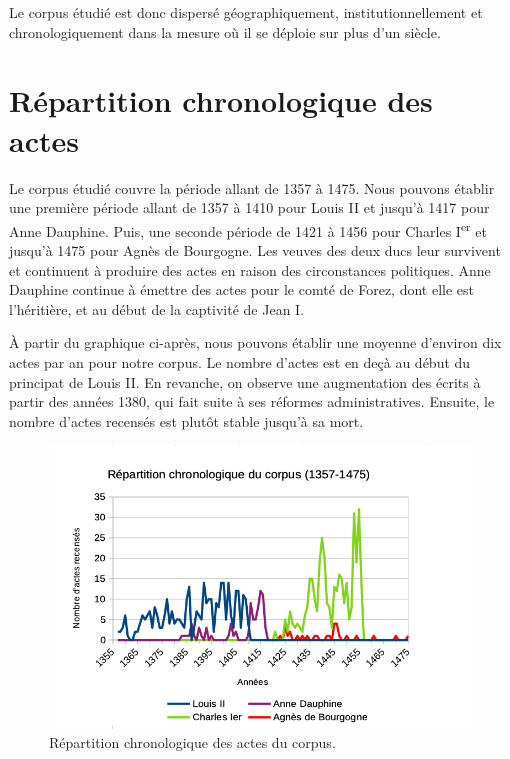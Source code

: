 \par Le corpus étudié est donc dispersé géographiquement, institutionnellement et chronologiquement dans la mesure où il se déploie sur plus d'un siècle. 

\section{Répartition chronologique des actes}
\label{I.1.2}

\par Le corpus étudié couvre la période allant de 1357 à 1475. Nous pouvons établir une première période allant de 1357 à 1410 pour Louis II et jusqu'à 1417 pour Anne Dauphine. Puis, une seconde période de 1421 à 1456 pour Charles I\textsuperscript{er} et jusqu'à 1475 pour Agnès de Bourgogne. Les veuves des deux ducs leur survivent et continuent à produire des actes en raison des circonstances politiques. Anne Dauphine continue à émettre des actes pour le comté de Forez, dont elle est l'héritière, et au début de la captivité de Jean I.
\newline 

\par À partir du graphique ci-après, nous pouvons établir une moyenne d'environ dix actes par an pour notre corpus. Le nombre d'actes est en deçà au début du principat de Louis II. En revanche, on observe une augmentation des écrits à partir des années 1380, qui fait suite à ses réformes administratives. Ensuite, le nombre d'actes recensés est plutôt stable jusqu'à sa mort. 

\begin{figure}[ht]
\centering
\includegraphics[scale=0.6]{img/repartition_chronologique_corpus.png}\caption{Répartition chronologique des actes du corpus.} \label{fig:chrono_actes}
\end{figure}
\newpage 


